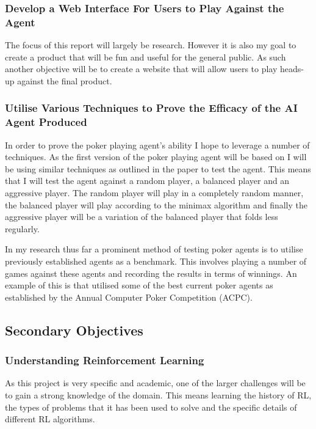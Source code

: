 \subsubsection{Develop a Web Interface For Users to Play Against the Agent}
The focus of this report will largely be research.
However it is also my goal to create a product that will be fun and useful for the general public.
As such another objective will be to create a website that will allow users to play heads-up against the final product.


\subsubsection{Utilise Various Techniques to Prove the Efficacy of the AI Agent Produced}
In order to prove the poker playing agent's ability I hope to leverage a number of techniques.
As the first version of the poker playing agent will be based on\cite{dahl2001reinforcement} I will be using similar
techniques as outlined in the paper to test the agent.
This means that I will test the agent against a random player, a balanced player and an aggressive player.
The random player will play in a completely random manner, the balanced player will play according to the minimax
algorithm and finally the aggressive player will be a variation of the balanced player that folds less regularly.

In my research thus far a prominent method of testing poker agents is to utilise previously established agents as
a benchmark.
This involves playing a number of games against these agents and recording the results in terms of winnings.
An example of this is\cite{heinrich2016deep} that utilised some of the best current poker agents
as established by the Annual Computer Poker Competition (ACPC).

\subsection{Secondary Objectives}\label{subsec:secondaryObjectives}
\subsubsection{Understanding Reinforcement Learning}
As this project is very specific and academic, one of the larger challenges will be to gain a strong knowledge of the domain.
This means learning the history of RL, the types of problems that it has been used to solve and the specific details of
different RL algorithms.

